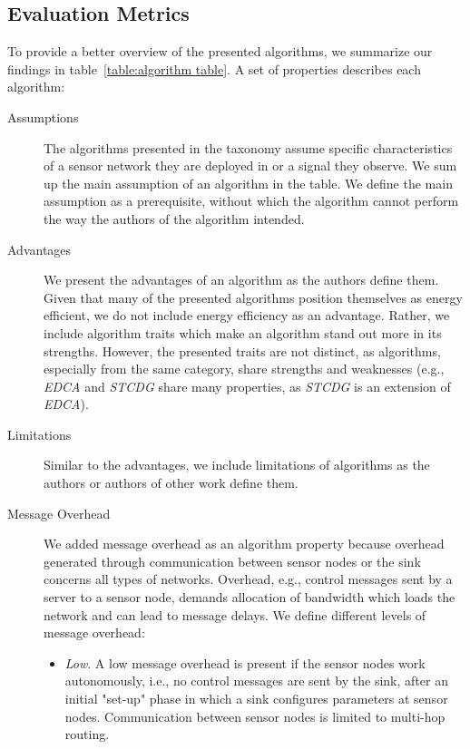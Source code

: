 \subsection{Evaluation Metrics}
\label{sec:Evaluation Metrics}

To provide a better overview of the presented algorithms, we summarize our
findings in table~\ref{table:algorithm table}. A
set of properties describes each algorithm:

\begin{description}
    \item[Assumptions]
        The algorithms presented in the taxonomy assume specific characteristics
        of a sensor network they are deployed in or a signal they observe. We
        sum up the main assumption of an algorithm in the table. We define the
        main assumption as a prerequisite, without which the algorithm cannot
        perform the way the authors of the algorithm intended.
    \item[Advantages]
        We present the advantages of an algorithm as the authors define them.
        Given that many of the presented algorithms position themselves as
        energy efficient, we do not include energy efficiency as an advantage.
        Rather, we include algorithm traits which make an algorithm stand out
        more in its strengths. However, the presented traits are not distinct,
        as algorithms, especially from the same category, share strengths and
        weaknesses (e.g., \textit{EDCA} and \textit{STCDG} share many
        properties, as \textit{STCDG} is an extension of \textit{EDCA}).
    \item[Limitations]
        Similar to the advantages, we include limitations of algorithms as the
        authors or authors of other work define them. 
    \item[Message Overhead]
        We added message overhead as an algorithm property because overhead
        generated through communication between sensor nodes or the sink
        concerns all types of networks. Overhead, e.g., control messages sent by
        a server to a sensor node, demands allocation of bandwidth which loads
        the network and can lead to message delays. We define different levels
        of message overhead:

        \begin{itemize}
            \item \textit{Low}. A low message overhead is present if the sensor
            nodes work autonomously, i.e., no control messages are sent by the
            sink, after an initial "set-up" phase in which a sink configures
            parameters at sensor nodes. Communication between sensor nodes is
            limited to multi-hop routing.


\end{itemize}
\end{description}
